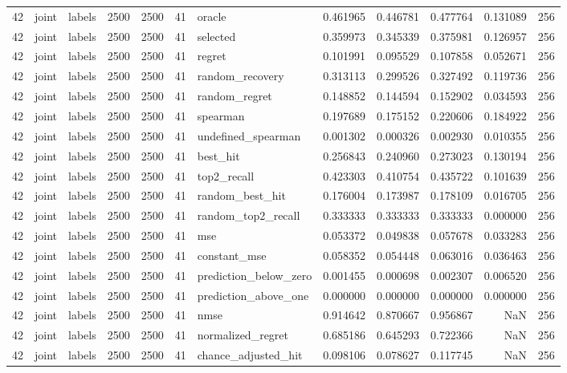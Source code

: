 \begin{tabular}{rllrrrlrrrrr}
42 & joint & labels & 2500 & 2500 & 41 & oracle & 0.461965 & 0.446781 & 0.477764 & 0.131089 & 256 \\
42 & joint & labels & 2500 & 2500 & 41 & selected & 0.359973 & 0.345339 & 0.375981 & 0.126957 & 256 \\
42 & joint & labels & 2500 & 2500 & 41 & regret & 0.101991 & 0.095529 & 0.107858 & 0.052671 & 256 \\
42 & joint & labels & 2500 & 2500 & 41 & random_recovery & 0.313113 & 0.299526 & 0.327492 & 0.119736 & 256 \\
42 & joint & labels & 2500 & 2500 & 41 & random_regret & 0.148852 & 0.144594 & 0.152902 & 0.034593 & 256 \\
42 & joint & labels & 2500 & 2500 & 41 & spearman & 0.197689 & 0.175152 & 0.220606 & 0.184922 & 256 \\
42 & joint & labels & 2500 & 2500 & 41 & undefined_spearman & 0.001302 & 0.000326 & 0.002930 & 0.010355 & 256 \\
42 & joint & labels & 2500 & 2500 & 41 & best_hit & 0.256843 & 0.240960 & 0.273023 & 0.130194 & 256 \\
42 & joint & labels & 2500 & 2500 & 41 & top2_recall & 0.423303 & 0.410754 & 0.435722 & 0.101639 & 256 \\
42 & joint & labels & 2500 & 2500 & 41 & random_best_hit & 0.176004 & 0.173987 & 0.178109 & 0.016705 & 256 \\
42 & joint & labels & 2500 & 2500 & 41 & random_top2_recall & 0.333333 & 0.333333 & 0.333333 & 0.000000 & 256 \\
42 & joint & labels & 2500 & 2500 & 41 & mse & 0.053372 & 0.049838 & 0.057678 & 0.033283 & 256 \\
42 & joint & labels & 2500 & 2500 & 41 & constant_mse & 0.058352 & 0.054448 & 0.063016 & 0.036463 & 256 \\
42 & joint & labels & 2500 & 2500 & 41 & prediction_below_zero & 0.001455 & 0.000698 & 0.002307 & 0.006520 & 256 \\
42 & joint & labels & 2500 & 2500 & 41 & prediction_above_one & 0.000000 & 0.000000 & 0.000000 & 0.000000 & 256 \\
42 & joint & labels & 2500 & 2500 & 41 & nmse & 0.914642 & 0.870667 & 0.956867 & NaN & 256 \\
42 & joint & labels & 2500 & 2500 & 41 & normalized_regret & 0.685186 & 0.645293 & 0.722366 & NaN & 256 \\
42 & joint & labels & 2500 & 2500 & 41 & chance_adjusted_hit & 0.098106 & 0.078627 & 0.117745 & NaN & 256 \\

\end{tabular}
